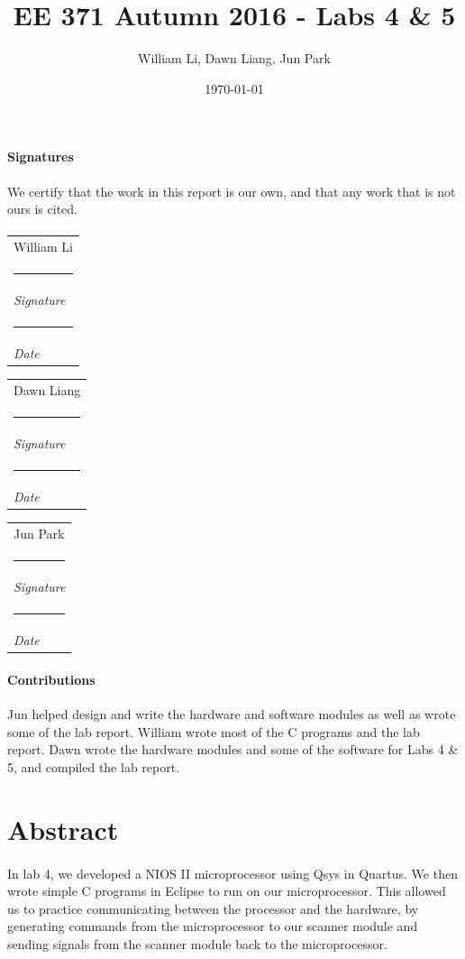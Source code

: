 \documentclass{article}
\title{EE 371 Autumn 2016 - Labs 4 \& 5}
\date{\today}
\author{William Li, Dawn Liang, Jun Park}
\begin{document}
\newcommand{\namesigdate}[2][5cm]{
  \begin{tabular}{@{}p{#1}@{}}
    #2 \\[2\normalbaselineskip] \hrule \\[0pt]
    {\small \textit{Signature}} \\[2\normalbaselineskip] \hrule \\[0pt]
    {\small \textit{Date}}
  \end{tabular}
}

\maketitle
\newpage

\paragraph{Signatures} We certify that the work in this report is our own, and that any work that is not ours is cited.
\paragraph{} \noindent \namesigdate{William Li} \hfill \namesigdate{Dawn Liang} \hfill \namesigdate{Jun Park}

\paragraph{Contributions} Jun helped design and write the hardware and software modules as well as wrote some of the lab report. William wrote most of the C programs and the lab report. Dawn wrote the hardware modules and some of the software for Labs 4 \& 5, and compiled the lab report.

\newpage

\tableofcontents
\newpage


\section{Abstract}
\paragraph{} In lab 4, we developed a NIOS II microprocessor using Qsys in Quartus. We then wrote simple C programs in Eclipse to run on our microprocessor. This allowed us to practice communicating between the processor and the hardware, by generating commands from the microprocessor to our scanner module and sending signals from the scanner module back to the microprocessor.
\end{document}
